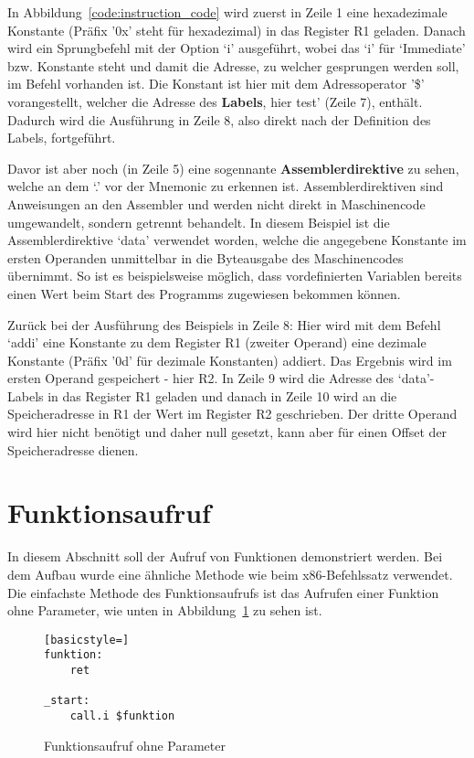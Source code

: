 In Abbildung~\ref{code:instruction_code} wird zuerst in Zeile 1 eine
hexadezimale Konstante (Präfix '0x' steht für hexadezimal) in das Register R1
geladen. Danach wird ein Sprungbefehl mit der Option `i' ausgeführt, wobei das
`i' für `Immediate' bzw. Konstante steht und damit die Adresse, zu welcher
gesprungen werden soll, im Befehl vorhanden ist.  Die Konstant ist hier mit dem
Adressoperator '\$' vorangestellt, welcher die Adresse des \textbf{Labels}, hier
test' (Zeile 7), enthält. Dadurch wird die Ausführung in Zeile 8, also direkt
nach der Definition des Labels, fortgeführt.

Davor ist aber noch (in Zeile 5) eine sogennante \textbf{Assemblerdirektive}
zu sehen, welche an dem `.' vor der Mnemonic zu erkennen ist.
Assemblerdirektiven sind Anweisungen an den Assembler und werden nicht direkt in
Maschinencode umgewandelt, sondern getrennt behandelt. In diesem Beispiel ist
die Assemblerdirektive `data' verwendet worden, welche die angegebene Konstante
im ersten Operanden unmittelbar in die Byteausgabe des Maschinencodes übernimmt.
So ist es beispielsweise möglich, dass vordefinierten Variablen bereits einen
Wert beim Start des Programms zugewiesen bekommen können.

Zurück bei der Ausführung des Beispiels in Zeile 8: Hier wird mit dem Befehl
`addi' eine Konstante zu dem Register R1 (zweiter Operand) eine dezimale
Konstante (Präfix '0d' für dezimale Konstanten) addiert. Das Ergebnis wird im
ersten Operand gespeichert - hier R2. In Zeile 9 wird die Adresse des
`data'-Labels in das Register R1 geladen und danach in Zeile 10 wird an die
Speicheradresse in R1 der Wert im Register R2 geschrieben. Der dritte Operand
wird hier nicht benötigt und daher null gesetzt, kann aber für einen Offset der
Speicheradresse dienen.
\pagebreak
\section{Funktionsaufruf}
In diesem Abschnitt soll der Aufruf von Funktionen demonstriert werden. Bei dem
Aufbau wurde eine ähnliche Methode wie beim x86-Befehlssatz verwendet. Die
einfachste Methode des Funktionsaufrufs ist das Aufrufen einer Funktion ohne
Parameter, wie unten in Abbildung~\ref{code:function_struct}  zu sehen ist.

\begin{figure}[htb]
\begin{lstlisting}[basicstyle=]
funktion:
	ret

_start:
	call.i $funktion
\end{lstlisting}
\caption{Funktionsaufruf ohne Parameter}
\label{code:function_struct}
\end{figure}

